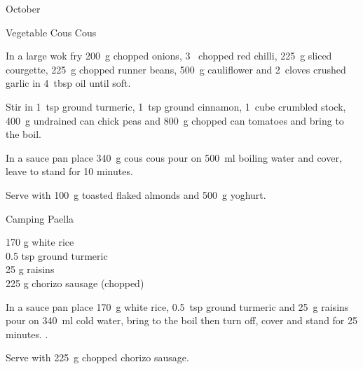 \begin{menu}{October}
\begin{recipe}{2}{Vegetable Cous Cous}
    \begin{instructions}
    \item 
        In a large wok fry
        200~g chopped onions,
        3~ chopped red chilli,
        225~g sliced courgette,
        225~g chopped runner beans,
        500~g  cauliflower
        and
        2~cloves crushed garlic
        in
        4~tbsp  oil
        until soft.
      \item 
        Stir in
        1~tsp  ground turmeric,
        1~tsp  ground cinnamon,
        1~cube crumbled stock,
        400~g undrained can chick peas
        and
        800~g chopped can tomatoes
        and bring to the boil.
      \item 
    In a
    sauce pan
    place
    340~g  cous cous
    pour on
    500~ml  boiling water
    and cover, leave to stand for 10 minutes.
  \item 
        Serve with
        100~g toasted flaked almonds
        and
        500~g  yoghurt.
      
    \end{instructions}
    \end{recipe}%
  
    \begin{recipe}{1}{Camping Paella}%
		\begin{ingredients}
		170 g white rice  \\
	0.5 tsp ground turmeric  \\
	25 g raisins  \\
	225 g chorizo sausage (chopped) \\
	
		\end{ingredients}
	
	
    \begin{instructions}
    \item 
    In a
    sauce pan
    place
    170~g  white rice,
    0.5~tsp  ground turmeric
    and
    25~g  raisins
    pour on
    340~ml  cold water,
    bring to the boil then turn off, cover and stand for 25 minutes.
  .
      \item 
        Serve with 225~g chopped chorizo sausage.
      
    \end{instructions}
    \end{recipe}%
  
    \clearpage
    \end{menu}
	
